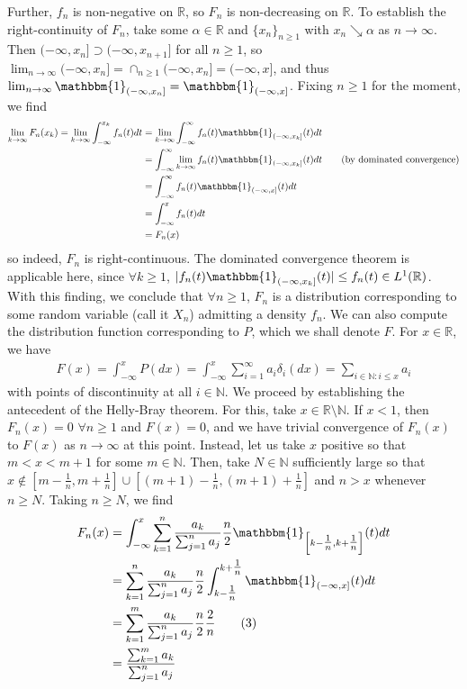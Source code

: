 \documentclass[10pt]{article}
\newcommand{\mbb}[1]{\mathbb{#1}}
\newcommand{\1}[1]{\mathbbm{1}_{#1}}
\begin{document}
    Further, $f_n$ is non-negative on $\mbb{R}$, so $F_n$ is non-decreasing on $\mbb{R}$. To establish the right-continuity of $F_n$, take some $\alpha\in\mbb{R}$ and $\{x_n\}_{n\geq 1}$ with $x_n\searrow\alpha$ as $n\rightarrow\infty$. Then $(-\infty,x_n]\supset(-\infty,x_{n+1}]$ for all $n\geq 1$, so $\lim_{n\rightarrow\infty}(-\infty,x_n]=\cap_{n\geq 1}(-\infty,x_n]=(-\infty,x]$, and thus $\lim_{n\rightarrow\infty}\1{(-\infty,x_n]}=\1{(-\infty,x]}$. Fixing $n\geq 1$ for the moment, we find
    \begin{align*}
        \lim_{k\rightarrow\infty}F_n(x_k)=\lim_{k\rightarrow\infty}\int_{-\infty}^{x_k}f_n(t)dt&=\lim_{k\rightarrow\infty}\int_{-\infty}^\infty f_n(t)\1{(-\infty,x_k]}(t)dt\\
        &=\int_{-\infty}^\infty \lim_{k\rightarrow\infty}f_n(t)\1{(-\infty,x_k]}(t)dt\tag{by dominated convergence}\\
        &=\int_{-\infty}^\infty f_n(t)\1{(-\infty,x]}(t)dt\\
        &=\int_{-\infty}^xf_n(t)dt\\
        &=F_n(x)
    \end{align*}
    so indeed, $F_n$ is right-continuous. The dominated convergence theorem is applicable here, since $\forall k\geq 1$, $|f_n(t)\1{(-\infty,x_k]}(t)|\leq f_n(t)\in L^1(\mbb{R})$. \\[5pt]
    With this finding, we conclude that $\forall n\geq 1$, $F_n$ is a distribution corresponding to some random variable (call it $X_n$)
    admitting a density $f_n$. We can also compute the distribution function corresponding to $P$, which we shall denote $F$. For $x\in\mbb{R}$, we have
    \begin{align*}
        F(x)=\int_{-\infty}^xP(dx)=\int_{-\infty}^x\sum_{i=1}^\infty a_i\delta_i(dx)=\sum_{i\in\mbb{N}:i\leq x}a_i
    \end{align*}
    with points of discontinuity at all $i\in\mbb{N}$. We proceed by establishing the antecedent of the Helly-Bray theorem. For this, take $x\in\mbb{R}\setminus\mbb{N}$. If $x<1$, then $F_n(x)=0$ $\forall n\geq 1$ and $F(x)=0$, and we have trivial convergence of $F_n(x)$ to $F(x)$ as $n\rightarrow\infty$ at this point.
    Instead, let us take $x$ positive so that $m<x<m+1$ for some $m\in\mbb{N}$. Then, take $N\in\mbb{N}$ sufficiently large so that $x\notin\left[m-\tfrac{1}{n},m+\tfrac{1}{n}\right]\cup\left[(m+1)-\tfrac{1}{n},(m+1)+\tfrac{1}{n}\right]$ and $n>x$ whenever $n\geq N$. Taking $n\geq N$, we find
    \begin{align*}
        F_n(x)&=\int_{-\infty}^x\sum_{k=1}^n\frac{a_k}{\sum_{j=1}^n a_j}\frac{n}{2}\1{\left[k-\tfrac{1}{n},k+\tfrac{1}{n}\right]}(t)dt\\
        &=\sum_{k=1}^n\frac{a_k}{\sum_{j=1}^na_j}\frac{n}{2}\int_{k-\tfrac{1}{n}}^{k+\tfrac{1}{n}}\1{(-\infty,x]}(t)dt\\
        &=\sum_{k=1}^m\frac{a_k}{\sum_{j=1}^n a_j}\frac{n}{2}\frac{2}{n}\tag{3}\\
        &=\frac{\sum_{k=1}^ma_k}{\sum_{j=1}^na_j}
    \end{align*}
\end{document}
